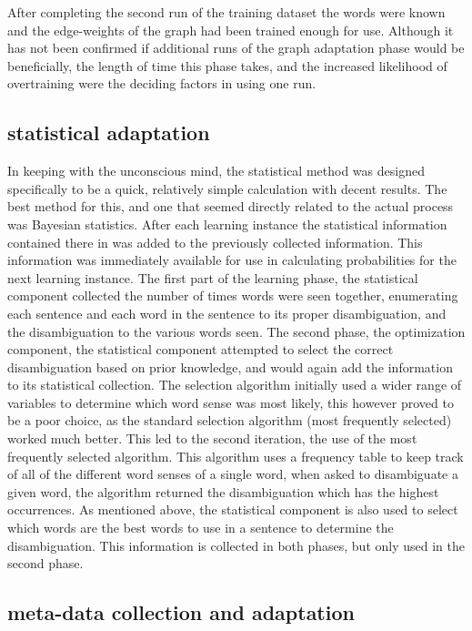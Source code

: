 After completing the second run of the training dataset the words were known and
the edge-weights of the graph had been trained enough for use.  Although it has
not been confirmed if additional runs of the graph adaptation phase would be
beneficially, the length of time this phase takes, and the increased likelihood
of overtraining were the deciding factors in using one run.

\subsection{statistical adaptation}

In keeping with the unconscious mind, the statistical method was designed
specifically to be a quick, relatively simple calculation with decent results.
The best method for this, and one that seemed directly related to the actual
process was Bayesian statistics.  After each learning instance the statistical
information contained there in was added to the previously collected
information.  This information was immediately available for use in calculating
probabilities for the next learning instance.  The first part of the learning
phase, the statistical component collected the number of times words were seen
together, enumerating each sentence and each word in the sentence to its proper
disambiguation, and the disambiguation to the various words seen.  The second
phase, the optimization component, the statistical component attempted to select
the correct disambiguation based on prior knowledge, and would again add the
information to its statistical collection.  The selection algorithm initially
used a wider range of variables to determine which word sense was most likely,
this however proved to be a poor choice, as the standard selection algorithm
(most frequently selected) worked much better.  This led to the second
iteration, the use of the most frequently selected algorithm.  This algorithm
uses a frequency table to keep track of all of the different word senses of a
single word, when asked to disambiguate a given word, the algorithm returned the
disambiguation which has the highest occurrences.  As mentioned above, the
statistical component is also used to select which words are the best words to
use in a sentence to determine the disambiguation. This information is collected
in both phases, but only used in the second phase.

\subsection{meta-data collection and adaptation}

